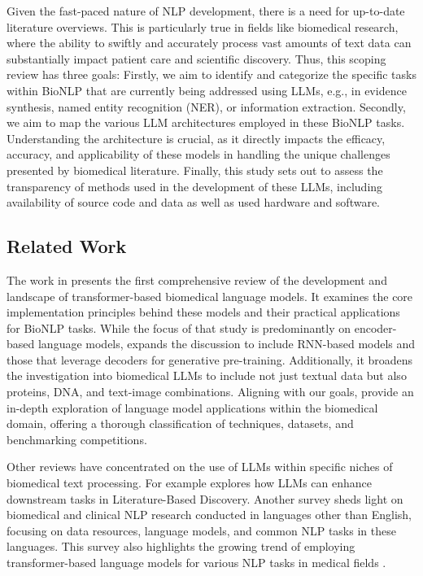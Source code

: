 \documentclass[fleqn,10pt]{olplainarticle}
\begin{document}
Given the fast-paced nature of NLP development, there is a need for up-to-date literature overviews. This is particularly true in fields like biomedical research, where the ability to swiftly and accurately process vast amounts of text data can substantially impact patient care and scientific discovery. Thus, this scoping review has three goals: Firstly, we aim to identify and categorize the specific tasks within BioNLP that are currently being addressed using LLMs, e.g., in evidence synthesis,  named entity recognition (NER), or information extraction. Secondly, we aim to map the various LLM architectures employed in these BioNLP tasks. Understanding the architecture is crucial, as it directly impacts the efficacy, accuracy, and applicability of these models in handling the unique challenges presented by biomedical literature. Finally, this study sets out to assess the transparency of methods used in the development of these LLMs, including availability of source code and data as well as used hardware and software.


\subsection*{Related Work}

The work in \citep{kalyan2022ammu} presents the first comprehensive review of the development and landscape of transformer-based biomedical language models. It examines the core implementation principles behind these models and their practical applications for BioNLP tasks. While the focus of that study is predominantly on encoder-based language models, \citep{wang2023pre} expands the discussion to include RNN-based models and those that leverage decoders for generative pre-training. Additionally, it broadens the investigation into biomedical LLMs to include not just textual data but also proteins, DNA, and text-image combinations. Aligning with our goals, \cite{wang2023pre} provide an in-depth exploration of language model applications within the biomedical domain, offering a thorough classification of techniques, datasets, and benchmarking competitions.

Other reviews have concentrated on the use of LLMs within specific niches of biomedical text processing. For example \cite{cesario2024survey} explores how LLMs can enhance downstream tasks in Literature-Based Discovery. Another survey sheds light on biomedical and clinical NLP research conducted in languages other than English, focusing on data resources, language models, and common NLP tasks in these languages. This survey also highlights the growing trend of employing transformer-based language models for various NLP tasks in medical fields \citep{shaitarova2023exploring}.
\end{document}
